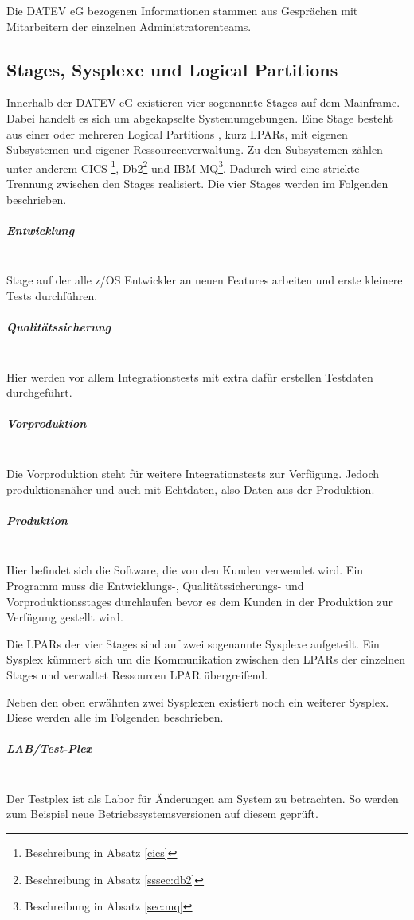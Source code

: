 Die DATEV eG bezogenen Informationen stammen aus Gesprächen mit Mitarbeitern der einzelnen Administratorenteams.

\subsection{Stages, Sysplexe und Logical Partitions}\label{sec:sysplex}
Innerhalb der DATEV eG existieren vier sogenannte \glqq Stages\grqq{} auf dem Mainframe.
Dabei handelt es sich um abgekapselte Systemumgebungen.
Eine Stage besteht aus einer oder mehreren \glqq Logical Partitions \grqq, kurz LPARs, mit eigenen Subsystemen und eigener Ressourcenverwaltung. 
Zu den Subsystemen zählen unter anderem CICS \footnote{Beschreibung in Absatz \ref{cics}},  Db2\footnote{Beschreibung in Absatz \ref{sssec:db2}} und IBM MQ\footnote{Beschreibung in Absatz \ref{sec:mq}}.
Dadurch wird eine strickte Trennung zwischen den Stages realisiert.
Die vier Stages werden im Folgenden beschrieben.

\subparagraph{\glqq Entwicklung\grqq}~\\
Stage auf der alle z/OS Entwickler an neuen Features arbeiten und erste kleinere Tests durchführen.

\subparagraph{\glqq Qualitätssicherung\grqq} ~\\
Hier werden vor allem Integrationstests mit extra dafür erstellen Testdaten durchgeführt.

\subparagraph{\glqq Vorproduktion\grqq}~\\
Die Vorproduktion steht für weitere Integrationstests zur Verfügung.
Jedoch produktionsnäher und auch mit Echtdaten, also Daten aus der Produktion.

\subparagraph{\glqq Produktion\grqq}~\\
Hier befindet sich die Software, die von den Kunden verwendet wird.
Ein Programm muss die Entwicklungs-, Qualitätssicherungs- und Vorproduktionsstages durchlaufen bevor es dem Kunden in der Produktion zur Verfügung gestellt wird.

Die LPARs der vier Stages sind auf zwei sogenannte  \glqq Sysplexe\grqq{} aufgeteilt.
Ein Sysplex kümmert sich um die Kommunikation zwischen den LPARs der einzelnen Stages und verwaltet Ressourcen LPAR übergreifend.
\cite{Kyne.2016}

Neben den oben erwähnten zwei Sysplexen existiert noch ein weiterer Sysplex.
Diese werden alle im Folgenden beschrieben.

\subparagraph{\glqq LAB/Test-Plex\grqq}~\\
Der Testplex ist als Labor für Änderungen am System zu betrachten.
So werden zum Beispiel neue Betriebssystemsversionen auf diesem geprüft.

